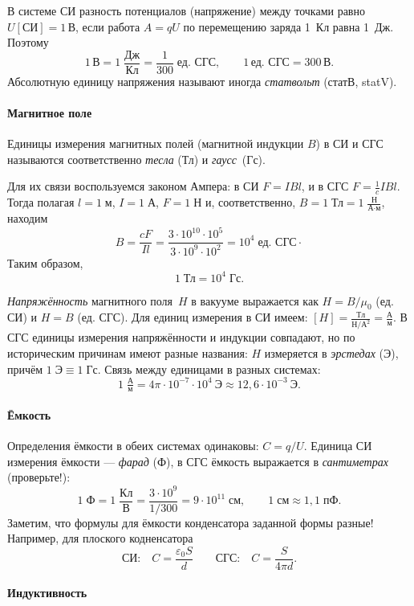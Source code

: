В системе СИ разность потенциалов (напряжение)
между точками равно $U[\text{СИ}]=1\,\text{В}$,
если работа $A=qU$ по перемещению заряда 1~Кл равна 1~Дж. Поэтому
\[
1\,\text{В}=1\;\frac{\text{Дж}}{\text{Кл}}=\frac{1}{300}\;\text{ед. СГС},\qquad1\,\text{ед. СГС}=300\,\text{В}.
\]
Абсолютную единицу напряжения называют иногда \emph{статвольт} (статВ, statV).


\paragraph{Магнитное поле}

Единицы измерения магнитных полей (магнитной индукции $B$) в СИ и СГС называются соответственно
\emph{тесла} (Тл) и \emph{гаусс}~(Гс).

Для их связи воспользуемся
законом Ампера: в СИ $F=IBl$, и в СГС $F=\frac{1}{c}IBl$. Тогда
полагая $l=1\;\text{м}$, $I=1\;\text{А}$, $F=1\;\text{Н}$ и, соответственно,
$B=1\;\text{Тл}=1\;\frac{\text{Н}}{\text{А}\cdot\text{м}}$, находим
\[
B=\frac{cF}{Il}=\frac{3\cdot10^{10}\cdot10^{5}}{3\cdot10^{9}\cdot10^{2}}=10^{4}\;\text{ед. СГС}\cdot
\]
Таким образом,
\[
1\;\text{Тл}=10^{4}\;\text{Гс}.
\]

\emph{Напряжённость} магнитного поля~$H$ в вакууме выражается как $H=B/\mu_0$ 
(ед. СИ) и $H=B$ (ед. СГС). Для единиц измерения в СИ имеем: 
$[H] = \frac{Тл}{Н/А^2}=\frac{А}{м}$. В СГС единицы измерения напряжённости
и индукции совпадают, но по историческим причинам имеют разные названия:
$H$ измеряется в \emph{эрстедах} (Э), причём $1\;\text{Э} \equiv 1\;\text{Гс}$.
Связь между единицами в разных системах:
\[
1\;\tfrac{А}{м} = 4\pi \cdot 10^{-7}\cdot 10^4~Э \approx 12,6\cdot 10^{-3}~Э.
\]


\paragraph{Ёмкость}

Определения ёмкости в обеих системах одинаковы: $C=q/U$. Единица СИ измерения ёмкости --- \emph{фарад} (Ф), в
СГС ёмкость выражается в \emph{сантиметрах} (проверьте!):
\[
1\;\text{Ф}=1\;\frac{\text{Кл}}{\text{В}}=\frac{3\cdot10^{9}}{1/300}=9\cdot10^{11}\;\text{см},\qquad1\;\text{см}\approx1{,}1\;\text{пФ}.
\]
Заметим, что формулы для ёмкости конденсатора заданной формы разные! 
Например, для плоского кодненсатора
    \[
\text{СИ:}\quad   C=\frac{\varepsilon_{0}S}{d}\qquad
\text{СГС:}\quad C=\frac{S}{4\pi d}.
    \]


\paragraph{Индуктивность}

